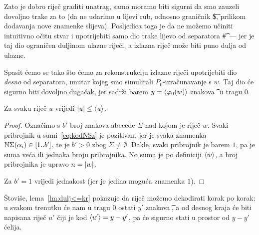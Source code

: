 Zato je dobro riječ graditi unatrag, samo moramo biti sigurni da smo zauzeli dovoljno trake za to (da ne udarimo u lijevi rub, odnosno graničnik \t\$, prilikom dodavanja nove znamenke slijeva). Posljedica toga je da ne možemo učiniti intuitivno očitu stvar i upotrijebiti samo dio trake lijevo od separatora \t\#\ ---  jer je taj dio ograničen duljinom ulazne riječi, a izlazna riječ može biti puno dulja od ulazne.

Spasit ćemo se tako što ćemo za rekonstrukciju izlazne riječi upotrijebiti dio \emph{desno} od separatora, unutar kojeg smo simulirali $P_0$-izračunavanje s $w$. Taj dio će sigurno biti dovoljno dugačak, jer sadrži barem $y=\langle\varphi_0(w)\rangle$ znakova \t\textbullet\ u tragu $0$.

\begin{lema}\label{lm:dulj<=kr}
Za svaku riječ $u$ vrijedi $\lvert u\rvert\le\langle u\rangle$.
\end{lema}
\begin{proof}
Označimo s $b'$ broj znakova abecede $\Sigma$ nad kojom je riječ $w$.
Svaki pribrojnik u sumi~\eqref{eq:kodNSz} je pozitivan, jer je svaka znamenka ${\mathbb N}\Sigma(\alpha_i)\in[1..b']$, te je $b'>0$ zbog $\Sigma\not=\emptyset$. Dakle, svaki pribrojnik je barem $1$, pa je suma veća ili jednaka broju pribrojnika. No suma je po definiciji $\langle w\rangle$, a broj pribrojnika je upravo $n=\lvert w\rvert$.

Za $b'=1$ vrijedi jednakost (jer je jedina moguća znamenka $1$).
\end{proof}

Štoviše, lema~\ref{lm:dulj<=kr} pokazuje da riječ možemo dekodirati korak po korak: u svakom trenutku će nam u tragu $0$ ostati $y'$ znakova \t\textbullet, a od desnog kraja će biti napisana riječ $u'$ čiji je kod $\langle u'\rangle=y-y'$, pa će sigurno stati u prostor od $y-y'$ ćelija.

